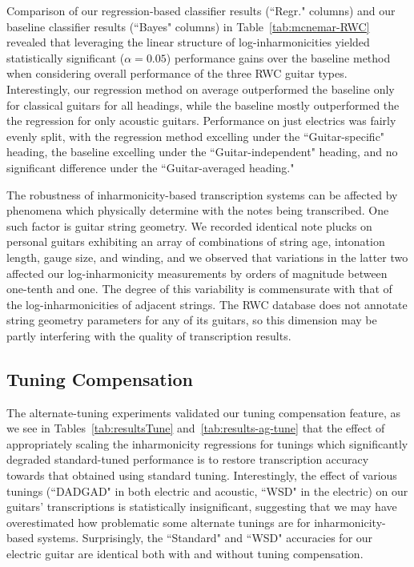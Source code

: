 \documentclass[convention,peer-reviewed]{aesconf}
\begin{document}
Comparison of our regression-based classifier results (``Regr." columns) and our baseline classifier results (``Bayes" columns) in Table~\ref{tab:mcnemar-RWC} revealed that leveraging the linear structure of log-inharmonicities yielded statistically significant ($\alpha = 0.05$) performance gains over the baseline method when considering overall performance of the three RWC guitar types. Interestingly, our regression method on average outperformed the baseline only for classical guitars for all headings, while the baseline mostly outperformed the the regression for only acoustic guitars. Performance on just electrics was fairly evenly split, with the regression method excelling under the ``Guitar-specific" heading, the baseline excelling under the ``Guitar-independent" heading, and no significant difference under the ``Guitar-averaged heading."

The robustness of inharmonicity-based transcription systems can be affected by phenomena which physically determine with the notes being transcribed. One such factor is guitar string geometry. We recorded identical note plucks on personal guitars exhibiting an array of combinations of string age, intonation length, gauge size, and winding, and we observed that variations in the latter two affected our log-inharmonicity measurements by orders of magnitude between one-tenth and one. The degree of this variability is commensurate with that of the log-inharmonicities of adjacent strings. The RWC database does not annotate string geometry parameters for any of its guitars, so this dimension may be partly interfering with the quality of transcription results.

\subsection{Tuning Compensation}
The alternate-tuning experiments validated our tuning compensation feature, as we see in Tables~\ref{tab:resultsTune} and~\ref{tab:results-ag-tune} that the effect of appropriately scaling the inharmonicity regressions for tunings which significantly degraded standard-tuned performance is to restore transcription accuracy towards that obtained using standard tuning. Interestingly, the effect of various tunings (``DADGAD" in both electric and acoustic, ``WSD" in the electric) on our guitars' transcriptions is statistically insignificant, suggesting that we may have overestimated how problematic some alternate tunings are for inharmonicity-based systems. Surprisingly, the ``Standard" and ``WSD" accuracies for our electric guitar are identical both with and without tuning compensation.
\end{document}
